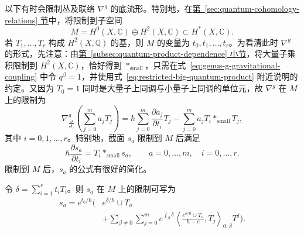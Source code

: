 以下有时会限制丛及联络 $\nabla^g$ 的底流形。特别地，在\hyperref[sec:quantum-cohomology-relations]{第~\ref*{sec:quantum-cohomology-relations} 节}中，将限制到子空间
\[
M=H^0(X,\mathbb C)\oplus H^2(X,\mathbb C)\subset H^*(X,\mathbb C).
\]
若 $T_1,\ldots,T_r$ 构成 $H^2(X,\mathbb Q)$ 的基，则 $M$ 的变量为 $t_0,t_1,\ldots,t_r$。为看清此时 $\nabla^g$ 的形式，先注意：由\hyperref[subsec:quantum-product-dependence]{第~\ref*{subsec:quantum-product-dependence} 小节}，将大量子乘积限制到 $H^2(X,\mathbb C)$，恰好得到 $*_{\mathrm{small}}$，只需在式~\eqref{eq:genus-g-gravitational-coupling} 中令 $q^\beta=1$，并使用式~\eqref{eq:restricted-big-quantum-product} 附近说明的约定。又因为 $T_0=1$ 同时是大量子上同调与小量子上同调的单位元，故 $\nabla^g$ 在 $M$ 上的限制为
\begin{equation}\label{eq:restricted-giventals-connection}
\nabla^g_{\frac{\partial}{\partial t_i}}\left(\sum_{j=0}^m a_jT_j\right)
=\hbar\sum_{j=0}^m\frac{\partial a_j}{\partial t_i}T_j
-\sum_{j=0}^m a_jT_i*_{\mathrm{small}}T_j,
\end{equation}
其中 $i=0,1,\ldots,r$。特别地，截面 $s_a$ 限制到 $M$ 后满足
\[
\hbar\frac{\partial s_a}{\partial t_i}=T_i*_{\mathrm{small}}s_a,
\qquad a=0,\ldots,m,\quad i=0,\ldots,r.
\]
限制到 $M$ 后，$s_a$ 的公式有很好的简化。
\begin{proposition}\label{prop:restricted-giventals-flat-sections}
令 $\delta=\sum_{i=1}^r t_iT_i$。则 $s_a$ 在 $M$ 上的限制可写为
\[
\begin{aligned}
s_a=e^{t_0/\hbar}\biggl(&e^{\delta/\hbar}\cup T_a\\
&+\sum_{\beta\ne0}\sum_{j=0}^m e^{\int_\beta\delta}
\left\langle\frac{e^{\delta/\hbar}\cup T_a}{\hbar-c},T_j\right\rangle_{0,\beta}T^j\biggr).
\end{aligned}
\]
\end{proposition}
